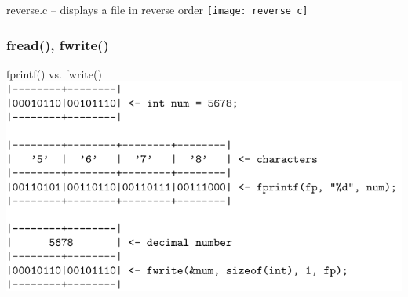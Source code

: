 \documentclass[hyperref={xetex,colorlinks,linkcolor=blue},green,compress]{beamer}
\begin{document}
\begin{frame}
  \begin{exampleblock}{reverse.c -- displays a file in reverse order}
    \texttt{[image: reverse\_c]}        
  \end{exampleblock}
\end{frame}

\begin{frame}\frametitle{fread(), fwrite()}
  \begin{exampleblock}{fprintf() vs. fwrite()}
    \includegraphics[width=\textwidth]{12345}            
  \end{exampleblock}
\end{frame}
\end{document}
